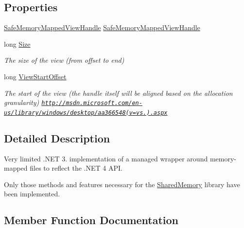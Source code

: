 \subsection*{Properties}
\begin{DoxyCompactItemize}
\item 
\hyperlink{class_microsoft_1_1_win32_1_1_safe_handles_1_1_safe_memory_mapped_view_handle}{Safe\+Memory\+Mapped\+View\+Handle} \hyperlink{class_system_1_1_i_o_1_1_memory_mapped_files_1_1_memory_mapped_view_ac856ac9c2d0a2db2d63dced0fac2ce2b}{Safe\+Memory\+Mapped\+View\+Handle}
\item 
long \hyperlink{class_system_1_1_i_o_1_1_memory_mapped_files_1_1_memory_mapped_view_ab5784eccaedc07d4c2e53489e7f70e4a}{Size}
\begin{DoxyCompactList}\small\item\em The size of the view (from offset to end) \end{DoxyCompactList}\item 
long \hyperlink{class_system_1_1_i_o_1_1_memory_mapped_files_1_1_memory_mapped_view_ad0648c88a67e3de3f48b6f5f022950f5}{View\+Start\+Offset}
\begin{DoxyCompactList}\small\item\em The start of the view (the handle itself will be aligned based on the allocation granularity) \href{http://msdn.microsoft.com/en-us/library/windows/desktop/aa366548(v=vs.85).aspx}{\tt http\+://msdn.\+microsoft.\+com/en-\/us/library/windows/desktop/aa366548(v=vs.).\+aspx} \end{DoxyCompactList}\end{DoxyCompactItemize}


\subsection{Detailed Description}


Very limited .N\+ET 3. implementation of a managed wrapper around memory-\/mapped files to reflect the .N\+ET 4 A\+PI.

Only those methods and features necessary for the \hyperlink{namespace_shared_memory}{Shared\+Memory} library have been implemented.

\subsection{Member Function Documentation}
\mbox{\label{class_system_1_1_i_o_1_1_memory_mapped_files_1_1_memory_mapped_view_aff06d7683c33a9e4575bd6ca9c65841f}} 

